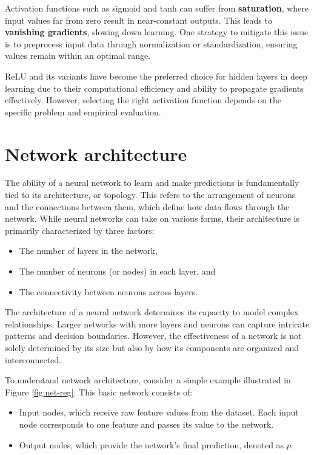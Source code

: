 \documentclass[
]{book}
\providecommand{\tightlist}{%
  \setlength{\itemsep}{0pt}\setlength{\parskip}{0pt}}
\theoremstyle{definition}
\theoremstyle{definition}
\theoremstyle{definition}
\theoremstyle{definition}
\theoremstyle{remark}
\begin{document}
Activation functions such as sigmoid and tanh can suffer from \textbf{saturation}, where input values far from zero result in near-constant outputs. This leads to \textbf{vanishing gradients}, slowing down learning. One strategy to mitigate this issue is to preprocess input data through normalization or standardization, ensuring values remain within an optimal range.

ReLU and its variants have become the preferred choice for hidden layers in deep learning due to their computational efficiency and ability to propagate gradients effectively. However, selecting the right activation function depends on the specific problem and empirical evaluation.

\section{Network architecture}\label{network-architecture}

The ability of a neural network to learn and make predictions is fundamentally tied to its architecture, or topology. This refers to the arrangement of neurons and the connections between them, which define how data flows through the network. While neural networks can take on various forms, their architecture is primarily characterized by three factors:

\begin{itemize}
\tightlist
\item
  The number of layers in the network,\\
\item
  The number of neurons (or nodes) in each layer, and\\
\item
  The connectivity between neurons across layers.
\end{itemize}

The architecture of a neural network determines its capacity to model complex relationships. Larger networks with more layers and neurons can capture intricate patterns and decision boundaries. However, the effectiveness of a network is not solely determined by its size but also by how its components are organized and interconnected.

To understand network architecture, consider a simple example illustrated in Figure \ref{fig:net-reg}. This basic network consists of:

\begin{itemize}
\tightlist
\item
  Input nodes, which receive raw feature values from the dataset. Each input node corresponds to one feature and passes its value to the network.\\
\item
  Output nodes, which provide the network's final prediction, denoted as \(p\).
\end{itemize}
\end{document}
